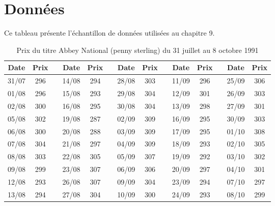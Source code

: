 \chapter{Données}
\label{chap:donnees}

Ce tableau présente l'échantillon de données utilisées au chapitre 9.

\begin{table}[htbp]
  \caption{Prix du titre Abbey National (penny sterling) du 31 juillet au 8 octobre 1991}
  \begin{center}
    \begin{tabular}{cccccccccccccc}
      \hline
      \textbf{Date} & \multicolumn{1}{c}{\textbf{Prix}} & & \textbf{Date} & \multicolumn{1}{c}{\textbf{Prix}} & & \textbf{Date} & \multicolumn{1}{c}{\textbf{Prix}} & & \textbf{Date} & \multicolumn{1}{c}{\textbf{Prix}} & & \textbf{Date} & \multicolumn{1}{c}{\textbf{Prix}} \\ \hline
      31/07 & 296 & & 14/08 & 294 & & 28/08 & 303 & & 11/09 & 296 & & 25/09 & 306 \\ 
      01/08 & 296 & & 15/08 & 293 & & 29/08 & 304 & & 12/09 & 301 & & 26/09 & 303 \\
      02/08 & 300 & & 16/08 & 295 & & 30/08 & 304 & & 13/09 & 298 & & 27/09 & 301 \\ 
      05/08 & 302 & & 19/08 & 287 & & 02/09 & 309 & & 16/09 & 295 & & 30/09 & 303 \\ 
      06/08 & 300 & & 20/08 & 288 & & 03/09 & 309 & & 17/09 & 295 & & 01/10 & 308 \\ 
      07/08 & 304 & & 21/08 & 297 & & 04/09 & 309 & & 18/09 & 293 & & 02/10 & 305 \\ 
      08/08 & 303 & & 22/08 & 305 & & 05/09 & 307 & & 19/09 & 292 & & 03/10 & 302 \\ 
      09/08 & 299 & & 23/08 & 307 & & 06/09 & 306 & & 20/09 & 297 & & 04/10 & 301 \\ 
      12/08 & 293 & & 26/08 & 307 & & 09/09 & 304 & & 23/09 & 294 & & 07/10 & 297 \\ 
      13/08 & 294 & & 27/08 & 304 & & 10/09 & 300 & & 24/09 & 293 & & 08/10 & 299 \\ 
      \hline
    \end{tabular}
  \end{center}
  \label{prixabbeyn}
\end{table}

